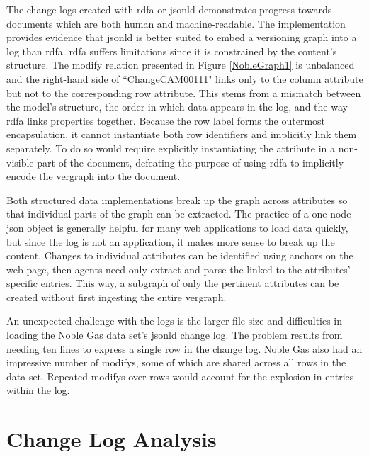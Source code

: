 The change logs created with \gls{rdfa} or \gls{jsonld} demonstrates progress towards documents which are both human and machine-readable.
The implementation provides evidence that \gls{jsonld} is better suited to embed a versioning graph into a \gls{log} than \gls{rdfa}.
\gls{rdfa} suffers limitations since it is constrained by the content's structure.
The \gls{modify} relation presented in Figure \ref{NobleGraph1} is unbalanced and the right-hand side of ``ChangeCAM00111" links only to the column \gls{attribute} but not to the corresponding row \gls{attribute}.
This stems from a mismatch between the model's structure, the order in which data appears in the \gls{log}, and the way \gls{rdfa} links properties together.
Because the row label forms the outermost encapsulation, it cannot instantiate both row identifiers and implicitly link them separately.
To do so would require explicitly instantiating the \gls{attribute} in a non-visible part of the document, defeating the purpose of using \gls{rdfa} to implicitly encode the \gls{vergraph} into the document.

Both structured data implementations break up the graph across \glspl{attribute} so that individual parts of the graph can be extracted.
The practice of a one-node \gls{json} object is generally helpful for many web applications to load data quickly, but since the \gls{log} is not an application, it makes more sense to break up the content.
Changes to individual \glspl{attribute} can be identified using anchors on the web page, then agents need only extract and parse the \gls{linked} to the \glspl{attribute}' specific entries.
This way, a subgraph of only the pertinent \glspl{attribute} can be created without first ingesting the entire \gls{vergraph}.

An unexpected challenge with the \glspl{log} is the larger file size and difficulties in loading the Noble Gas data set's \gls{jsonld} change log.
The problem results from needing ten lines to express a single row in the change log.
Noble Gas also had an impressive number of \glspl{modify}, some of which are shared across all rows in the data set.
Repeated \glspl{modify} over rows would account for the explosion in entries within the \gls{log}.

\section{Change Log Analysis} \label{sec:CLA}

